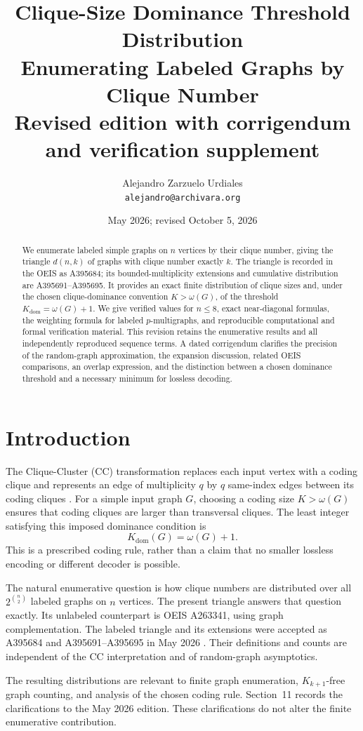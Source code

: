 \documentclass[11pt,a4paper]{article}
\title{Clique-Size Dominance Threshold Distribution\\[0.3em]
\large Enumerating Labeled Graphs by Clique Number\\[0.2em]
\normalsize Revised edition with corrigendum and verification supplement}
\author{Alejandro Zarzuelo Urdiales\\\texttt{alejandro@archivara.org}}
\date{May 2026; revised October 5, 2026}
\theoremstyle{definition}
\newcommand{\Kdom}{K_{\mathrm{dom}}}
\begin{document}
\maketitle
\begin{abstract}
We enumerate labeled simple graphs on $n$ vertices by their clique number,
giving the triangle $d(n,k)$ of graphs with clique number exactly $k$.
The triangle is recorded in the OEIS as A395684; its bounded-multiplicity
extensions and cumulative distribution are A395691--A395695.
It provides an exact finite distribution of clique sizes and, under the
chosen clique-dominance convention $K>\omega(G)$, of the threshold
$\Kdom=\omega(G)+1$. We give verified values for $n\leq8$, exact
near-diagonal formulas, the weighting formula for labeled $p$-multigraphs,
and reproducible computational and formal verification material.
This revision retains the enumerative results and all independently
reproduced sequence terms. A dated corrigendum clarifies the precision of
the random-graph approximation, the expansion discussion, related OEIS
comparisons, an overlap expression, and the distinction between a chosen
dominance threshold and a necessary minimum for lossless decoding.
\end{abstract}

\section{Introduction}
The Clique-Cluster (CC) transformation replaces each input vertex with a
coding clique and represents an edge of multiplicity $q$ by $q$
same-index edges between its coding cliques \cite{zarzuelo2025}.
For a simple input graph $G$, choosing a coding size $K>\omega(G)$
ensures that coding cliques are larger than transversal cliques.
The least integer satisfying this imposed dominance condition is
\[
  \Kdom(G)=\omega(G)+1.
\]
This is a prescribed coding rule, rather than a claim that no smaller
lossless encoding or different decoder is possible.

The natural enumerative question is how clique numbers are distributed
over all $2^{\binom n2}$ labeled graphs on $n$ vertices. The present triangle
answers that question exactly. Its unlabeled counterpart is OEIS
A263341, using graph complementation. The labeled triangle and its
extensions were accepted as A395684 and A395691--A395695 in May 2026
\cite{oeis}. Their definitions and counts are independent of the CC
interpretation and of random-graph asymptotics.

The resulting distributions are relevant to finite graph enumeration,
$K_{k+1}$-free graph counting, and analysis of the chosen coding rule.
Section~11 records the clarifications to the May 2026 edition.
These clarifications do not alter the finite enumerative contribution.
\end{document}
